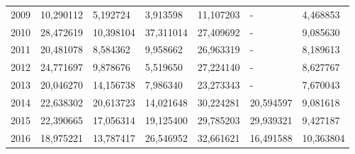 \begin{table}
\begin{tabular}{p{1cm}p{2cm}p{2cm}p{2cm}p{2cm}p{2cm}p{2cm}}
 2009 &                10,290112 &                         5,192724 &                                           3,913598 & 11,107203 &                                      - &                            4,468853 \\
 2010 &                28,472619 &                        10,398104 &                                          37,311014 & 27,409692 &                                      - &                            9,085630 \\
 2011 &                20,481078 &                         8,584362 &                                           9,958662 & 26,963319 &                                      - &                            8,189613 \\
 2012 &                24,771697 &                         9,878676 &                                           5,519650 & 27,224140 &                                      - &                            8,627767 \\
 2013 &                20,046270 &                        14,156738 &                                           7,986340 & 23,273343 &                                      - &                            7,670043 \\
 2014 &                22,638302 &                        20,613723 &                                          14,021648 & 30,224281 &                              20,594597 &                            9,081618 \\
 2015 &                22,390665 &                        17,056314 &                                          19,125400 & 29,785203 &                              29,939321 &                            9,427187 \\
 2016 &                18,975221 &                        13,787417 &                                          26,546952 & 32,661621 &                              16,491588 &                           10,363804 \\
\bottomrule
\end{tabular}
\end{table}
